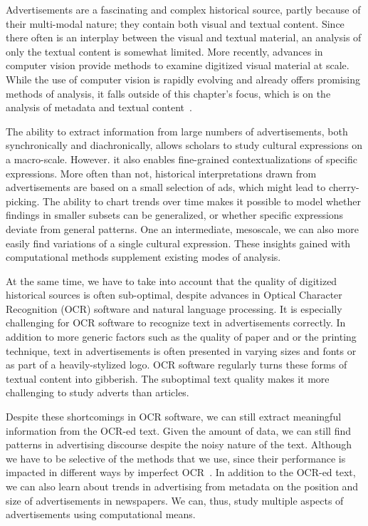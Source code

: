 \documentclass[USenglish]{article}
\begin{document}
Advertisements are a fascinating and complex historical source, partly because of their multi-modal nature; they contain both visual and textual content. Since there often is an interplay between the visual and textual material, an analysis of only the textual content is somewhat limited. More recently, advances in computer vision provide methods to examine digitized visual material at scale. While the use of computer vision is rapidly evolving and already offers promising methods of analysis, it falls outside of this chapter's focus, which is on the analysis of metadata and textual content~\cite{wevers_visual_2020,arnold_distant_2019,Bergel_2015}.

The ability to extract information from large numbers of advertisements, both synchronically and diachronically, allows scholars to study cultural expressions on a macro-scale. However. it also enables fine-grained contextualizations of specific expressions. More often than not, historical interpretations drawn from advertisements are based on a small selection of ads, which might lead to cherry-picking. The ability to chart trends over time makes it possible to model whether findings in smaller subsets can be generalized, or whether specific expressions deviate from general patterns. One an intermediate, mesoscale,  we can also more easily find variations of a single cultural expression. These insights gained with computational methods supplement existing modes of analysis. 

At the same time, we have to take into account that the quality of digitized historical sources is often sub-optimal, despite advances in Optical Character Recognition (OCR) software and natural language processing. It is especially challenging for OCR software to recognize text in advertisements correctly. In addition to more generic factors such as the quality of paper and or the printing technique, text in advertisements is often presented in varying sizes and fonts or as part of a heavily-stylized logo. OCR software regularly turns these forms of textual content into gibberish. The suboptimal text quality makes it more challenging to study adverts than articles.

Despite these shortcomings in OCR software, we can still extract meaningful information from the OCR-ed text. Given the amount of data, we can still find patterns in advertising discourse despite the noisy nature of the text. Although we have to be selective of the methods that we use, since their performance is impacted in different ways by imperfect OCR~\cite{van_strien_assessing_2020}. In addition to the OCR-ed text, we can also learn about trends in advertising from metadata on the position and size of advertisements in newspapers. We can, thus, study multiple aspects of advertisements using computational means. 
\end{document}
